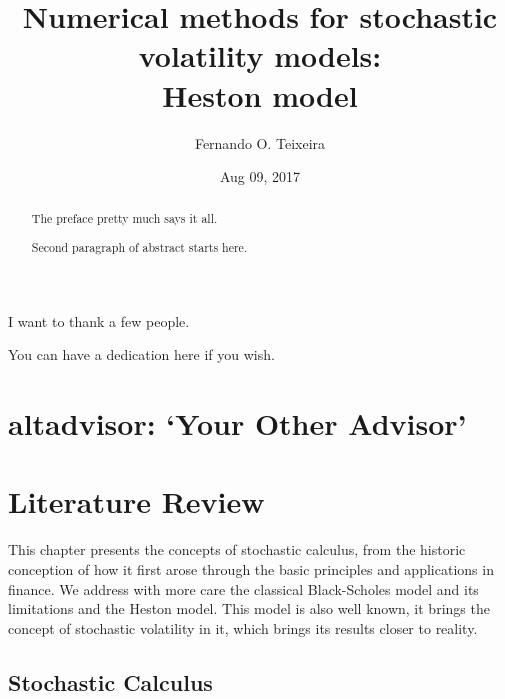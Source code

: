 \documentclass[12pt,twoside]{reedthesis}
\title{\textbf{\Huge{Numerical methods for stochastic volatility models: \\[20pt] Heston model}}}
\author{Fernando O. Teixeira}
\date{Aug 09, 2017}
\theoremstyle{definition}
\theoremstyle{definition}
\theoremstyle{remark}
\begin{document}
      \maketitle
  
  \frontmatter %
  \pagestyle{empty} %
      \begin{acknowledgements}
      I want to thank a few people.
    \end{acknowledgements}
  
      \hypersetup{linkcolor=black}
    \setcounter{tocdepth}{2}
    \tableofcontents
  
      \listoftables
  
      \listoffigures
      \begin{abstract}
      The preface pretty much says it all. \par  Second paragraph of abstract
      starts here.
    \end{abstract}
      \begin{dedication}
      You can have a dedication here if you wish.
    \end{dedication}
  \mainmatter %
  \pagestyle{fancyplain} %

  \chapter{\texorpdfstring{altadvisor: `Your Other
  Advisor'}{altadvisor: Your Other Advisor}}\label{altadvisor-your-other-advisor}
  
  \chapter{Literature Review}\label{lt-review}
  
  This chapter presents the concepts of stochastic calculus, from the
  historic conception of how it first arose through the basic principles
  and applications in finance. We address with more care the classical
  Black-Scholes model and its limitations and the Heston model. This model
  is also well known, it brings the concept of stochastic volatility in
  it, which brings its results closer to reality.
  
  \section{Stochastic Calculus}\label{stochastic-calculus}
  
\end{document}
